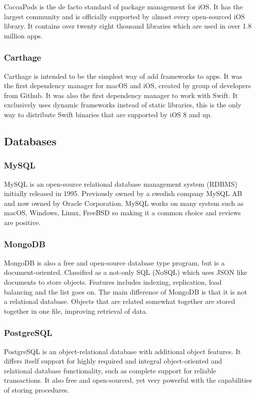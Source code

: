 CocoaPods \cite{pods} is the de facto standard of package management for iOS. It has the largest community and is officially supported by almost every open-sourced iOS library. It contains over twenty eight thousand libraries which are used in over 1.8 million apps.

\subsubsection{Carthage}

Carthage \cite{carthage} is intended to be the simplest way of add frameworks to apps. It was the first dependency manager for macOS and iOS, created by group of developers from Github. It was also the first dependency manager to work with Swift. It exclusively uses dynamic frameworks instead of static libraries, this is the only way to distribute Swift binaries that are supported by iOS 8 and up.

\subsection{Databases}

\subsubsection{MySQL}
MySQL \cite{sql} is an open-source relational database management system (RDBMS) initially released in 1995. Previously owned by a swedish company MySQL AB and now owned by Oracle Corporation. MySQL works on many system such as macOS, Windows, Linux, FreeBSD so making it a common choice and reviews are positive.

\subsubsection{MongoDB}
MongoDB \cite{mongoDB} is also a free and open-source database type program, but is a document-oriented. Classified as a not-only SQL (NoSQL) which uses JSON like documents to store objects. Features includes indexing, replication, load balancing and the list goes on. The main difference of MongoDB is that it is not a relational database. Objects that are related somewhat together are stored together in one file, improving retrieval of data.

\subsubsection{PostgreSQL}
PostgreSQL \cite{postgreSQL} is an object-relational database with additional object features. It differs itself support for highly required and integral object-oriented and relational database functionality, such as complete support for reliable transactions. It also free and open-sourced, yet very powerful with the capabilities of storing procedures.

